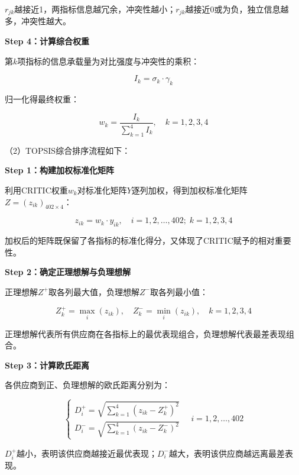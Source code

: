 \documentclass[12pt,a4paper]{ctexart}
\theoremstyle{definition}
\theoremstyle{plain}
\theoremstyle{remark}
\begin{document}
$r_{jk}$越接近1，两指标信息越冗余，冲突性越小；$r_{jk}$越接近0或为负，独立信息越多，冲突性越大。

\textbf{Step 4：计算综合权重}

第$k$项指标的信息承载量为对比强度与冲突性的乘积：

\begin{equation}
I_k = \sigma_k \cdot \gamma_k
\end{equation}

归一化得最终权重：

\begin{equation}
w_k = \frac{I_k}{\sum_{k=1}^{4} I_k}, \quad k = 1, 2, 3, 4
\end{equation}

（2）TOPSIS综合排序流程如下：

\textbf{Step 1：构建加权标准化矩阵}

利用CRITIC权重$w_k$对标准化矩阵$Y$逐列加权，得到加权标准化矩阵$Z = (z_{ik})_{402 \times 4}$：

\begin{equation}
z_{ik} = w_k \cdot y_{ik}, \quad i = 1, 2, \dots, 402;\; k = 1, 2, 3, 4
\end{equation}

加权后的矩阵既保留了各指标的标准化得分，又体现了CRITIC赋予的相对重要性。

\textbf{Step 2：确定正理想解与负理想解}

正理想解$Z^+$取各列最大值，负理想解$Z^-$取各列最小值：

\begin{equation}
Z_k^+ = \max_i(z_{ik}), \quad Z_k^- = \min_i(z_{ik}), \quad k = 1, 2, 3, 4
\end{equation}

正理想解代表所有供应商在各指标上的最优表现组合，负理想解代表最差表现组合。

\textbf{Step 3：计算欧氏距离}

各供应商到正、负理想解的欧氏距离分别为：

\begin{equation}
\begin{cases}
D_i^+ = \sqrt{\sum_{k=1}^{4} (z_{ik} - Z_k^+)^2} \\[10pt]
D_i^- = \sqrt{\sum_{k=1}^{4} (z_{ik} - Z_k^-)^2}
\end{cases}
\quad i = 1, 2, \dots, 402
\end{equation}

$D_i^+$越小，表明该供应商越接近最优表现；$D_i^-$越大，表明该供应商越远离最差表现。
\end{document}
